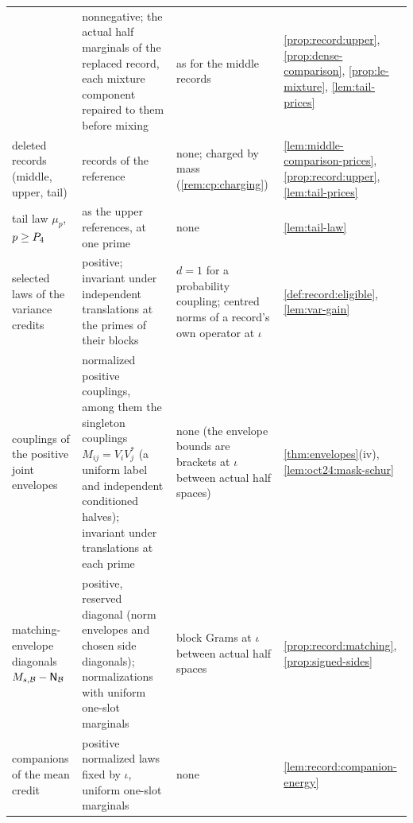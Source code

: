 {\begin{longtable}{@{}>{\raggedright\arraybackslash}p{3.45cm}%
>{\raggedright\arraybackslash}p{4.4cm}%
>{\raggedright\arraybackslash}p{3.65cm}%
>{\raggedright\arraybackslash}p{3.15cm}@{}}
& nonnegative; the actual half marginals of the replaced record, each mixture
 component repaired to them before mixing
& as for the middle records
& \cref{prop:record:upper}, \cref{prop:dense-comparison},
 \cref{prop:le-mixture}, \cref{lem:tail-prices}\\
deleted records (middle, upper, tail)
& records of the reference
& none; charged by mass (\cref{rem:cp:charging})
& \cref{lem:middle-comparison-prices}, \cref{prop:record:upper},
 \cref{lem:tail-prices}\\
tail law $\mu_p$, $p\ge P_4$
& as the upper references, at one prime
& none
& \cref{lem:tail-law}\\
selected laws of the variance credits
& positive; invariant under independent translations at the primes of their
 blocks
& $d=1$ for a probability coupling; centred norms of a record's own operator at
 $\iota$
& \cref{def:record:eligible}, \cref{lem:var-gain}\\
couplings of the positive joint envelopes
& normalized positive couplings, among them the singleton couplings
 $M_{ij}=V_iV_j^*$ (a uniform label and independent conditioned halves);
 invariant under translations at each prime
& none (the envelope bounds are brackets at $\iota$ between actual half spaces)
& \cref{thm:envelopes}(iv), \cref{lem:oct24:mask-schur}\\
matching-envelope diagonals $M_{s,\mathcal B}-\mathsf N_{\mathcal B}$
& positive, reserved diagonal (norm envelopes and chosen side diagonals);
 normalizations with uniform one-slot marginals
& block Grams at $\iota$ between actual half spaces
& \cref{prop:record:matching}, \cref{prop:signed-sides}\\
companions of the mean credit
& positive normalized laws fixed by $\iota$, uniform one-slot marginals
& none
& \cref{lem:record:companion-energy}\\
\end{longtable}
}

